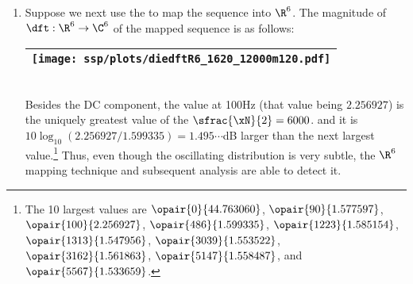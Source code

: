 \begin{example}
\begin{enumerate}
  \item \label{item:nonstat34_12000m120_R6}
    Suppose we next use the   to map
    the sequence into $\R^6$.
    The magnitude of $\dft:\R^6\to\C^6$ of the mapped sequence is as follows:
    \\\begin{tabular}{|>{\scs}c|}
         \hline
         \texttt{[image: ssp/plots/diedftR6\_1620\_12000m120.pdf]}%
       \\\hline
    \end{tabular}\\
     Besides the DC component, the value at 100Hz (that value being $2.256927$) 
     is the uniquely greatest value of the $\sfrac{\xN}{2}=6000$.
     and it is $10\log_{10}(2.256927/1.599335)=1.495\cdots$dB larger than the next largest value.\footnote{
     The 10 largest values are
       $\opair{   0}{44.763060}$, 
       $\opair{  90}{ 1.577597}$, 
       $\opair{ 100}{ 2.256927}$, 
       $\opair{ 486}{ 1.599335}$, 
       $\opair{1223}{ 1.585154}$, 
       $\opair{1313}{ 1.547956}$,
       $\opair{3039}{ 1.553522}$, 
       $\opair{3162}{ 1.561863}$,
       $\opair{5147}{ 1.558487}$, and
       $\opair{5567}{ 1.533659}$.
     }
     Thus, even though the oscillating distribution is very subtle, the $\R^6$ mapping technique
     and subsequent analysis are able to detect it.
\end{enumerate}
\end{example}


